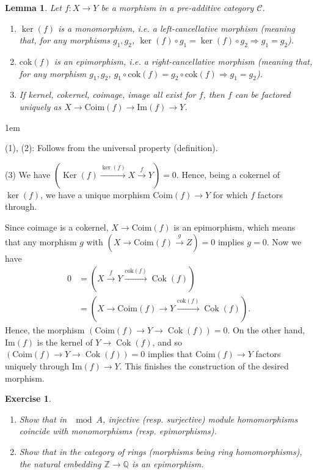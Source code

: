\documentclass[11pt,a4paper]{article}
\makeatletter
\numberwithin{equation}{section}
\renewenvironment{proof}[1][\proofname]{\par
    \pushQED{\qed}%
    \normalfont \topsep0\p@\@plus6\p@ \labelsep1em\relax
    \trivlist
    \item[\hskip\labelsep\indent
        \bfseries #1]\ignorespaces
    \mbox{}
}{
    \popQED\endtrivlist\@endpefalse
}
\theoremstyle{all}
\newtheorem{lemma}[theorem]{Lemma}
\newtheorem{exercise}[theorem]{Exercise}
\theoremstyle{remark}
\newcommand{\CC}{\mathcal{C}}
\newcommand{\Ker}{\operatorname{Ker}\nolimits}
\newcommand{\Cok}{\operatorname{Cok}\nolimits}
\newcommand{\defn}[1]{\textsl{\color{darkblue} #1}}
\makeatother
\begin{document}
\begin{lemma}\label{lem:ker cok im coim}
Let $f:X\to Y$ be a morphism in a pre-additive category $\CC$.
\begin{enumerate}
\item $\ker(f)$ is a \defn{monomorphism}, i.e. a left-cancellative morphism (meaning that, for any morphisms $g_1,g_2$, $\ker(f)\circ g_1 = \ker(f)\circ g_2 \Rightarrow g_1=g_2$).

\item $\mathrm{cok}(f)$ is an \defn{epimorphism}, i.e. a right-cancellative morphism (meaning that, for any morphism $g_1,g_2$, $g_1\circ \mathrm{cok}(f)=g_2\circ\mathrm{cok}(f) \Rightarrow g_1=g_2$).

\item If kernel, cokernel, coimage, image all exist for $f$, then $f$ can be factored uniquely as $X\to \mathrm{Coim}(f)\to \mathrm{Im}(f) \to Y$.
\end{enumerate}
\end{lemma}
\begin{proof}
(1), (2):  Follows from the universal property (definition).

(3) We have $(\Ker(f)\xrightarrow{\ker(f)}X\xrightarrow{f}Y)=0$. Hence, being a cokernel of $\ker(f)$, we have a unique morphism $\mathrm{Coim}(f)\to Y$ for which $f$ factors through.  

Since coimage is a cokernel, $X\to \mathrm{Coim}(f)$ is an epimorphism, which means that any morphism $g$ with $(X\to \mathrm{Coim}(f) \xrightarrow{g} Z)=0$ implies $g=0$.
Now we have
\begin{align*}
0 &= (X\xrightarrow{f} Y \xrightarrow{\mathrm{cok}(f)} \Cok(f)) \\
&= (X\to \mathrm{Coim}(f) \to  Y \xrightarrow{\mathrm{cok}(f)} \Cok(f)).
\end{align*} 
Hence, the morphism $(\mathrm{Coim}(f) \to Y \to \Cok(f))=0$.
On the other hand, $\mathrm{Im}(f)$ is the kernel of $Y\to \Cok(f)$, and so $(\mathrm{Coim}(f) \to Y \to \Cok(f))=0$ implies that $\mathrm{Coim}(f)\to Y$ factors uniquely through $\mathrm{Im}(f)\to Y$.  This finishes the construction of the desired morphism.
\end{proof}

\begin{exercise}
\begin{enumerate}
\item Show that in $\mod A$, injective (resp. surjective) module homomorphisms coincide with monomorphisms (resp. epimorphisms).
\item Show that in the category of rings (morphisms being ring homomorphisms), the natural embedding $\mathbb{Z}\to\mathbb{Q}$ is an epimorphism.
\end{enumerate}
\end{exercise}
\end{document}
